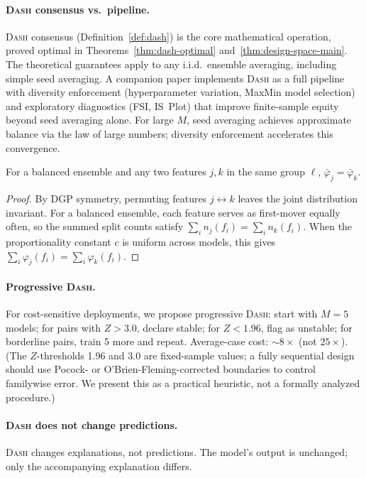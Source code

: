 \documentclass{jmlr}
\newcommand{\DASH}{\textsc{Dash}}
\begin{document}
\paragraph{\DASH{} consensus vs.\ pipeline.}
\DASH{} consensus (Definition~\ref{def:dash}) is the core mathematical operation, proved optimal in Theorems~\ref{thm:dash-optimal} and~\ref{thm:design-space-main}. The theoretical guarantees apply to any i.i.d.\ ensemble averaging, including simple seed averaging. A companion paper implements \DASH{} as a full pipeline with diversity enforcement (hyperparameter variation, MaxMin model selection) and exploratory diagnostics (FSI, IS~Plot) that improve finite-sample equity beyond seed averaging alone. For large $M$, seed averaging achieves approximate balance via the law of large numbers; diversity enforcement accelerates this convergence.

\begin{corollary}[\DASH{} achieves equity (axiom-derived)]
\label{cor:equity}
For a balanced ensemble and any two features $j, k$ in the same group $\ell$, $\bar{\varphi}_j = \bar{\varphi}_k$.
\end{corollary}

\begin{proof}
By DGP symmetry, permuting features $j \leftrightarrow k$ leaves the joint distribution invariant. For a balanced ensemble, each feature serves as first-mover equally often, so the summed split counts satisfy $\sum_i n_j(f_i) = \sum_i n_k(f_i)$. When the proportionality constant $c$ is uniform across models, this gives $\sum_i \varphi_j(f_i) = \sum_i \varphi_k(f_i)$.
\end{proof}

\paragraph{Progressive \DASH{}.}
For cost-sensitive deployments, we propose progressive \DASH{}: start with $M{=}5$ models; for pairs with $Z > 3.0$, declare stable; for $Z < 1.96$, flag as unstable; for borderline pairs, train 5 more and repeat. Average-case cost: ${\sim}8\times$ (not $25\times$).
(The $Z$-thresholds 1.96 and 3.0 are fixed-sample values; a fully sequential design should use Pocock- or O'Brien-Fleming-corrected boundaries to control familywise error. We present this as a practical heuristic, not a formally analyzed procedure.)

\paragraph{\DASH{} does not change predictions.}
\DASH{} changes explanations, not predictions. The model's output is unchanged; only the accompanying explanation differs.
\end{document}

